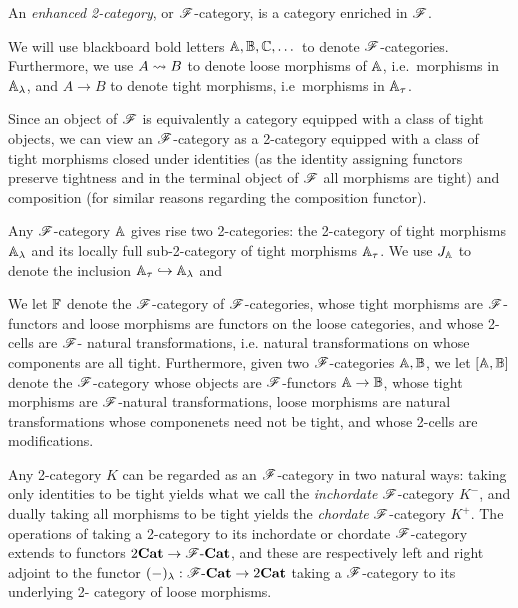\documentclass[../thesis.tex]{subfiles}
\begin{document}
\begin{definition}\label{def:F-category}
  An \emph{enhanced 2-category}, or ${\mathscr{F}}$-category, is a category enriched in ${\mathscr{F}}$.
\end{definition}
\begin{notation}
  We will use blackboard bold letters ${\mathbb{A}},{\mathbb{B}},{\mathbb{C}},\dots$ to denote ${\mathscr{F}}$-categories. Furthermore,
  we use $A \rightsquigarrow B$ to denote loose morphisms of ${\mathbb{A}}$, i.e.\ morphisms in ${\mathbb{A}}_\lambda$, and
  $A \to B$ to denote tight morphisms, i.e\ morphisms in ${\mathbb{A}}_\tau$.
\end{notation}
\begin{remark}
  Since an object of ${\mathscr{F}}$ is equivalently a category equipped with a class of tight objects, we
  can  view an ${\mathscr{F}}$-category as a 2-category equipped with a class of tight morphisms closed under
  identities (as the identity assigning functors preserve tightness and in the terminal object of
  ${\mathscr{F}}$ all morphisms are tight) and composition (for similar reasons regarding the composition functor).
\end{remark}

Any ${\mathscr{F}}$-category ${\mathbb{A}}$ gives rise two 2-categories: the 2-category of tight morphisms ${\mathbb{A}}_
\lambda$ and its locally full sub-2-category of tight morphisms ${\mathbb{A}}_\tau$. We use $J_{\mathbb{A}}$ to
denote the inclusion ${\mathbb{A}}_\tau \hookrightarrow {\mathbb{A}}_\lambda$ and

We let ${\mathbb{F}}$ denote the ${\mathscr{F}}$-category of ${\mathscr{F}}$-categories, whose tight morphisms are ${\mathscr{F}}$-%
functors and loose morphisms are functors on the loose categories, and whose 2-cells are ${\mathscr{F}}$-%
natural transformations, i.e. natural transformations on whose components are all tight.
Furthermore, given two ${\mathscr{F}}$-categories ${\mathbb{A}},{\mathbb{B}}$, we let $[{\mathbb{A}},{\mathbb{B}}]$ denote the ${\mathscr{F}}$-category
whose objects are ${\mathscr{F}}$-functors ${\mathbb{A}} \to {\mathbb{B}}$, whose tight morphisms are ${\mathscr{F}}$-natural
transformations, loose morphisms are natural transformations whose componenets need not be
tight, and whose 2-cells are modifications.

Any 2-category $K$ can be regarded as an ${\mathscr{F}}$-category in two natural ways: taking only
identities to be tight yields what we call the \emph{inchordate} ${\mathscr{F}}$-category $K^-$, and 
dually taking all morphisms to be tight yields the \emph{chordate} ${\mathscr{F}}$-category $K^+$. The
operations of taking a 2-category to its inchordate or chordate ${\mathscr{F}}$-category extends to
functors $2{\mathbf{Cat}} \to {\mathscr{F}}\text-{\mathbf{Cat}}$, and these are respectively left and right adjoint to the
functor $(-)_\lambda : {\mathscr{F}}\text-{\mathbf{Cat}} \to 2{\mathbf{Cat}}$ taking a ${\mathscr{F}}$-category to its underlying 2-%
category of loose morphisms.
\end{document}

